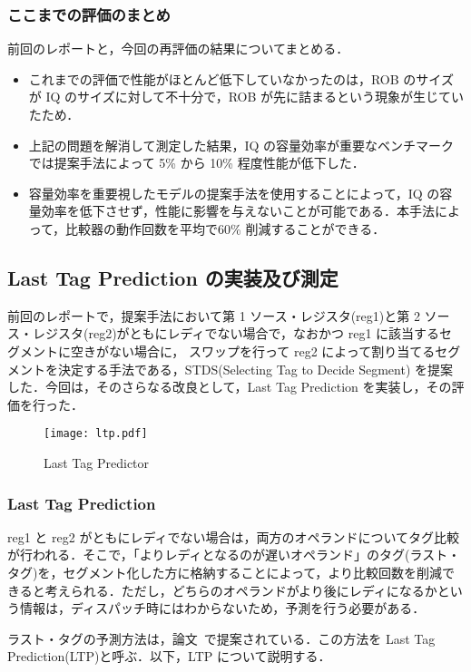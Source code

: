 \documentclass[twocolumn]{jsarticle}
\begin{document}
  \subsubsection{ここまでの評価のまとめ}
  前回のレポートと，今回の再評価の結果についてまとめる．
  \begin{itemize}
    \item これまでの評価で性能がほとんど低下していなかったのは，ROB のサイズが IQ のサイズに対して不十分で，ROB が先に詰まるという現象が生じていたため．
    \item 上記の問題を解消して測定した結果，IQ の容量効率が重要なベンチマークでは提案手法によって 5\% から 10\% 程度性能が低下した．
    \item 容量効率を重要視したモデルの提案手法を使用することによって，IQ の容量効率を低下させず，性能に影響を与えないことが可能である．本手法によって，比較器の動作回数を平均で60\% 削減することができる．
  \end{itemize}

  \subsection{Last Tag Prediction の実装及び測定}
  前回のレポートで，提案手法において第 1 ソース・レジスタ(reg1)と第 2 ソース・レジスタ(reg2)がともにレディでない場合で，なおかつ reg1 に該当するセグメントに空きがない場合に， スワップを行って reg2 によって割り当てるセグメントを決定する手法である，STDS(Selecting Tag to Decide Segment) を提案した．今回は，そのさらなる改良として，Last Tag Prediction を実装し，その評価を行った．
  
  \begin{figure}[ht]
    \centering
    \texttt{[image: ltp.pdf]}
    \caption{Last Tag Predictor}
    \label{fig:ltp}
  \end{figure}

  \subsubsection{Last Tag Prediction}
  reg1 と reg2 がともにレディでない場合は，両方のオペランドについてタグ比較が行われる．そこで，「よりレディとなるのが遅いオペランド」のタグ(ラスト・タグ)を，セグメント化した方に格納することによって，より比較回数を削減できると考えられる．ただし，どちらのオペランドがより後にレディになるかという情報は，ディスパッチ時にはわからないため，予測を行う必要がある．

  ラスト・タグの予測方法は，論文~\cite{ernst2002}で提案されている．この方法を Last Tag Prediction(LTP)と呼ぶ．以下，LTP について説明する．
\end{document}
